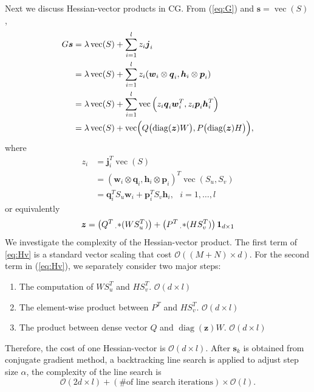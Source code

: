 \documentclass[11pt,twoside]{article}
\newcommand{\bsym}[1]{\ensuremath{\boldsymbol{#1}}}
\newcommand{\bw}{\ensuremath{\bsym{w}}}
\newcommand{\bj}{\ensuremath{\bsym{j}}}
\newcommand{\bp}{\ensuremath{\bsym{p}}}
\newcommand{\bq}{\ensuremath{\bsym{q}}}
\newcommand{\bz}{\ensuremath{\bsym{z}}}
\newcommand{\bh}{\ensuremath{\bsym{h}}}
\newcommand{\bs}{\ensuremath{\bsym{s}}}
\newcommand{\pointprod}[2]{\ensuremath{\left( #1 \operatorname{\prescript{}{\cdot}{\ast}} #2 \right)}}
\newcommand{\bbO}[1]{\ensuremath{\mathcal{O}\left(#1\right)}}
\DeclareMathOperator*{\diag}{diag}
\DeclareMathOperator*{\vectorize}{vec}
\begin{document}
Next we discuss Hessian-vector products in CG.
From (\ref{eq:G}) and $\bs=\vectorize(S)$,
\begin{align}
    G \bs         &= \lambda \vectorize(S) + \sum_{i=1}^l z_i \bj_i \\
                  &= \lambda \vectorize(S) + \sum_{i=1}^l z_i (\bw_i\otimes \bq_i, \bh_i \otimes \bp_i) \nonumber \\
                  &= \lambda \vectorize(S) + \sum_{i=1}^l \vectorize\left(z_i \bq_i \bw_i^T, z_i \bp_i \bh_i^T\right)  \\
                  &= \lambda \vectorize(S) +  \vectorize \Bigl ( Q \bigl(\diag(\bsym{z}) W \bigr) , P \bigl ( \diag(\bsym{z}) H \bigr) \Bigr) \label{eq:Hv},
\end{align}
where
\begin{equation}
\begin{aligned}
    z_i&= \bj_i^T \vectorize(S)\\
    &=(\bw_i\otimes\bq_i,\bh_i\otimes\bp_i)^T\vectorize(S_u, S_v)\\
    &=\bq_i^T S_u \bw_i + \bp_i^T S_v \bh_i, \text{ }i=1,\dots,l
    \label{eq:DefZi}
\end{aligned}
\end{equation}
or equivalently
\begin{equation}
    \bz = \pointprod{Q^T}{(WS_u^T)}+\pointprod{P^T}{(HS_v^T)}\bsym{1}_{d\times 1}
    \label{eq:CalcZ}
\end{equation}
We investigate the complexity of the Hessian-vector product. The first term of 
\eqref{eq:Hv} is a standard vector scaling that cost \bbO{(M+N) \times d}.
For the second term in (\ref{eq:Hv}), we separately consider two major steps:
\begin{enumerate}
    \item The computation of $WS_u^T$ and $HS_v^T$. $\bbO{d \times l}$
    \item The element-wise product between $P^T$ and $HS_v^T$.  $\bbO{ d \times l}$
    \item The product between dense vector $Q$ and $\diag{(\bsym{z})}W$. $\bbO{d \times l}$
\end{enumerate}
Therefore, the cost of one Hessian-vector  is $\bbO{d \times l}$. After $\bs_k$ is obtained from conjugate gradient method, a backtracking line search is applied to adjust step size $\alpha$, the complexity of the line search is
\begin{equation*}
\bbO{2d \times l} + (\text{\# of line search iterations})\times \bbO{l}.
\end{equation*}
\end{document}

